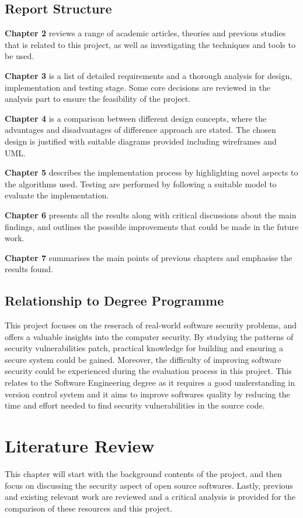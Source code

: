 \documentclass[12pt, a4paper]{report}
\begin{document}
\section{Report Structure}
\textbf{Chapter 2} reviews a range of academic articles, theories and previous studies that
is related to this project, as well as investigating the techniques and tools to be used.

\noindent\textbf{Chapter 3} is a list of detailed requirements and a thorough analysis for design,
implementation and testing stage. Some core decisions are reviewed in the analysis part to ensure
the feasibility of the project.

\noindent\textbf{Chapter 4} is a comparison between different design concepts, where the advantages
and disadvantages of difference approach are stated. The chosen design is justified with suitable
diagrams provided including wireframes and UML.

\noindent\textbf{Chapter 5} describes the implementation process by highlighting novel aspects to
the algorithms used. Testing are performed by following a suitable model to evaluate the
implementation.

\noindent\textbf{Chapter 6} presents all the results along with critical discussions about the main
findings,	and outlines the possible improvements that could be made in the future work.

\noindent\textbf{Chapter 7} summarises the main points of previous chapters and emphasise the
results found.

\section{Relationship to Degree Programme}
This project focuses on the reserach of real-world software security problems, and offers a valuable
insights into the computer security. By studying the patterns of security vulnerabilities patch,
practical knowledge for building and ensuring a secure system could be gained. Moreover, the
difficulty of improving software security could be experienced during the evaluation process in this
project. This relates to the Software Engineering degree as it requires a good understanding in
version control system and it aims to improve softwares quality by reducing the time and effort
needed to find security vulnerabilities in the source code.

\chapter{Literature Review}
This chapter will start with the background contents of the project, and then focus on discussing
the security aspect of open source softwares. Lastly, previous and existing relevant work are
reviewed and a critical analysis is provided for the comparison of these resources and this project.
\end{document}
